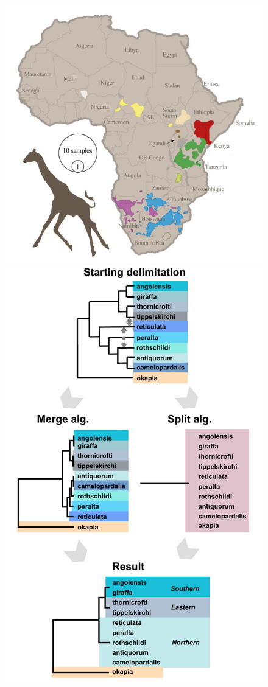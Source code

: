 \documentclass[A4]{article1}
\begin{document}
\begin{figure}[t]
    \centering %
    \includegraphics[scale=0.10]{figs/fig-giraffe} %
    \includegraphics[scale=0.10]{figs/fig-giraffe-results}  %
    

\end{figure}
\end{document}
